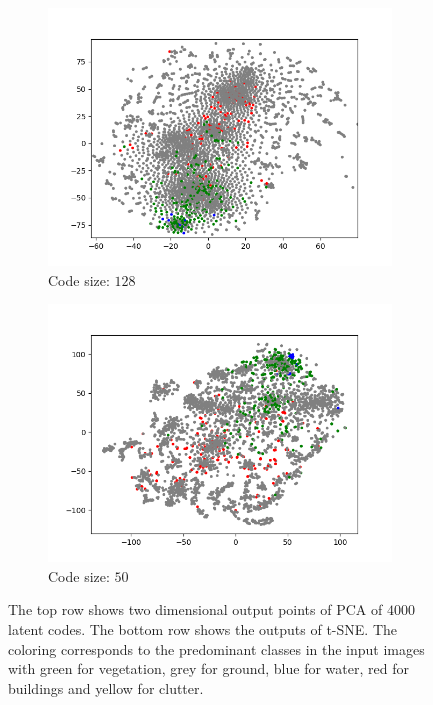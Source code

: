 \begin{figure}[H]
\begin{subfigure}{.25\textwidth}
        \includegraphics[width=\textwidth]{images/figures/experiments_latent/convolutional_dim1024_classes.png}   
        \caption{Code size: $128$}
    \end{subfigure}%
    \begin{subfigure}{.25\textwidth}
        \centering
        \includegraphics[width=\textwidth]{images/figures/experiments_latent/convolutional_dim50_classes.png}
        \caption{Code size: $50$}
    \end{subfigure}
    \caption{The top row shows two dimensional output points of PCA of $4000$ latent codes. 
    The bottom row shows the outputs
    of t-SNE. The coloring corresponds to the predominant classes in the input images with green for vegetation, 
    grey for ground, blue for water, red for buildings and yellow for clutter.}
\end{figure}


